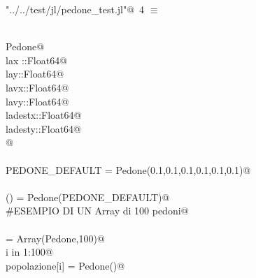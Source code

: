 \documentclass[]{article}
\begin{document}
\begin{flushleft} \small
\begin{minipage}{\linewidth} \label{scrap6}
\protect{}\verb@"../../test/jl/pedone_test.jl"@\nobreak\ {\footnotesize 4 }$\equiv$
\vspace{-1ex}
\begin{list}{}{} \item
\mbox{}\verb@@\\
\mbox{}\verb@type Pedone@\\
\mbox{}\verb@      lax ::Float64@\\
\mbox{}\verb@      lay::Float64@\\
\mbox{}\verb@      lavx::Float64@\\
\mbox{}\verb@      lavy::Float64@\\
\mbox{}\verb@      ladestx::Float64@\\
\mbox{}\verb@      ladesty::Float64@\\
\mbox{}\verb@      @\\
\mbox{}\verb@end@\\
\mbox{}\verb@const PEDONE_DEFAULT = Pedone(0.1,0.1,0.1,0.1,0.1,0.1)@\\
\mbox{}\verb@@\\
\mbox{}\verb@Pedone() = Pedone(PEDONE_DEFAULT)@\\
\mbox{}\verb@\#ESEMPIO DI UN Array di 100 pedoni@\\
\mbox{}\verb@@\\
\mbox{}\verb@popolazione = Array(Pedone,100)@\\
\mbox{}\verb@for i in 1:100@\\
\mbox{}\verb@   popolazione[i] = Pedone()@\\
\mbox{}\verb@end@\\
\mbox{}\verb@@{\NWsep}
\end{list}
\vspace{-2ex}
\end{minipage}\\[4ex]
\end{flushleft}

%
\end{document}
